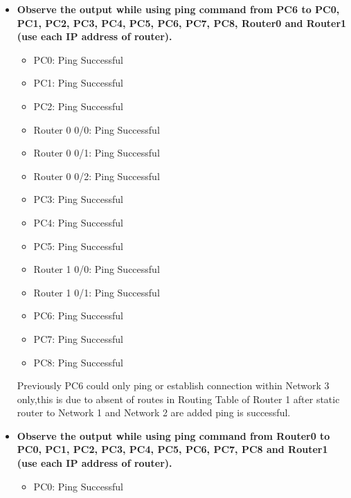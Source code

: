 \documentclass[a4paper,11pt]{article}
\begin{document}
\begin{enumerate}
\begin{itemize}
                  \item \textbf{Observe the output while using ping command from PC6 to PC0, PC1, PC2, PC3, PC4, PC5, PC6,
                              PC7, PC8, Router0 and Router1 (use each IP address of router).}
                        \begin{itemize}
                              \item PC0: Ping Successful
                              \item PC1: Ping Successful
                              \item PC2: Ping Successful
                              \item Router 0 0/0: Ping Successful
                              \item Router 0 0/1: Ping Successful
                              \item Router 0 0/2: Ping Successful
                              \item PC3: Ping Successful
                              \item PC4: Ping Successful
                              \item PC5: Ping Successful
                              \item Router 1 0/0: Ping Successful
                              \item Router 1 0/1: Ping Successful
                              \item PC6: Ping Successful

                              \item PC7: Ping Successful
                              \item PC8: Ping Successful
                        \end{itemize}

                        Previously PC6 could only ping or establish connection within  Network 3 only,this is due to absent of routes in Routing Table of Router 1 after static router to Network 1 and Network 2 are added ping is successful.

                  \item \textbf{Observe the output while using ping command from Router0 to PC0, PC1, PC2, PC3, PC4, PC5,
                              PC6, PC7, PC8 and Router1 (use each IP address of router).}
                        \begin{itemize}
                              \item PC0: Ping Successful


\end{itemize}
\end{itemize}
\end{enumerate}
\end{document}
